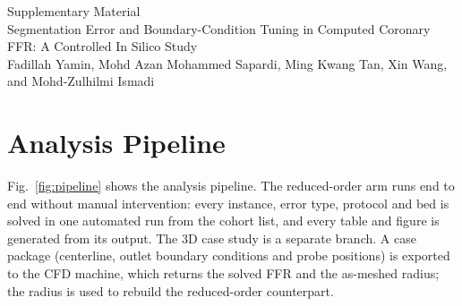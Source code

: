 \documentclass[journal,twoside,web,onecolumn]{ieeecolor}
\begin{document}
\sloppy
\pagestyle{plain}
\begin{center}
{\large Supplementary Material}\\[3pt]
{\small Segmentation Error and Boundary-Condition Tuning in Computed Coronary FFR: A Controlled In Silico Study}\\[2pt]
{\footnotesize Fadillah Yamin, Mohd Azan Mohammed Sapardi, Ming Kwang Tan, Xin Wang, and Mohd-Zulhilmi Ismadi}
\end{center}
\vspace{2pt}

\section{Analysis Pipeline}
Fig.~\ref{fig:pipeline} shows the analysis pipeline. The reduced-order arm
runs end to end without manual intervention: every instance, error type, protocol and bed is solved in one automated run
from the cohort list, and every table and figure is generated from its output. The 3D case study is a separate
branch. A case package (centerline, outlet boundary conditions and probe positions) is exported to the CFD machine,
which returns the solved FFR and the as-meshed radius; the radius is used to rebuild the reduced-order counterpart.
\end{document}
